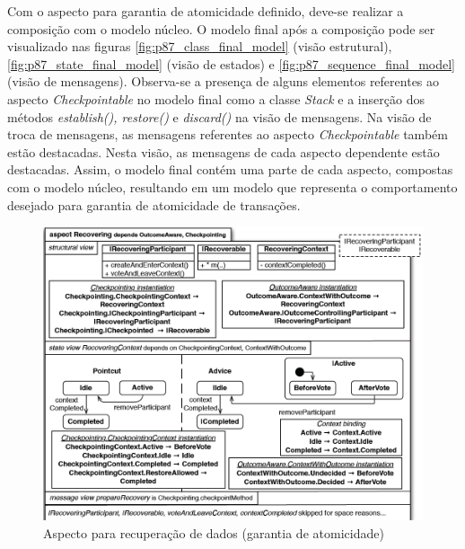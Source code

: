 Com o aspecto para garantia de atomicidade definido, deve-se realizar a composição com o modelo núcleo. O modelo final após a composição pode ser
visualizado nas figuras \ref{fig:p87_class_final_model} (visão estrutural), \ref{fig:p87_state_final_model} (visão de estados) e \ref{fig:p87_sequence_final_model} (visão de mensagens). 
Observa-se a presença de alguns elementos referentes ao aspecto \textit{Checkpointable} no modelo final como a classe \textit{Stack} e a inserção dos métodos \textit{establish(),
restore()} e \textit{discard()} na visão de mensagens. Na visão de troca de mensagens, as mensagens referentes ao aspecto \textit{Checkpointable}
também estão destacadas. Nesta visão, as mensagens de cada aspecto dependente estão destacadas. Assim, o modelo final contém uma parte de cada
aspecto, compostas com o modelo núcleo, resultando em um modelo que representa o comportamento desejado para garantia de atomicidade de transações.

\begin{landscape}
\begin{figure}
	\centering
	\includegraphics[scale=0.5]{img/p87_recovering_aspect.png}
	\caption{Aspecto para recuperação de dados (garantia de atomicidade)}\label{fig:p87_recovering_aspect.png}
\end{figure}
\end{landscape}

